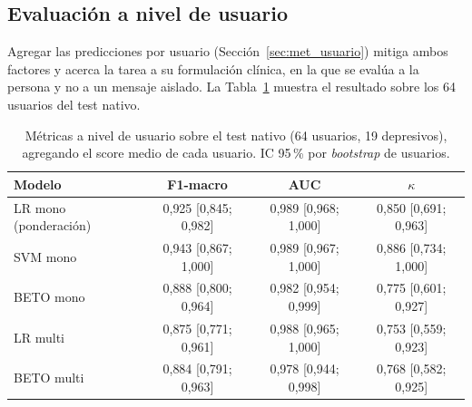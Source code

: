\documentclass[12pt,a4paper]{article}
\begin{document}
\subsection{Evaluación a nivel de usuario}
\label{sec:res_usuario}
Agregar las predicciones por usuario (Sección~\ref{sec:met_usuario}) mitiga ambos factores y acerca la tarea a su formulación clínica, en la que se evalúa a la persona y no a un mensaje aislado. La Tabla~\ref{tab:usuario} muestra el resultado sobre los 64 usuarios del test nativo.

\begin{table}[H]
\centering
\footnotesize
\setlength{\tabcolsep}{4pt}
\caption{Métricas a nivel de usuario sobre el test nativo (64 usuarios, 19 depresivos), agregando el score medio de cada usuario. IC 95\,\% por \emph{bootstrap} de usuarios.}
\label{tab:usuario}
\begin{tabular}{lccc}
\toprule
\textbf{Modelo} & \textbf{F1-macro} & \textbf{AUC} & \textbf{$\kappa$} \\
\midrule
LR mono (ponderación) & 0{,}925 {\scriptsize [0{,}845; 0{,}982]} & 0{,}989 {\scriptsize [0{,}968; 1{,}000]} & 0{,}850 {\scriptsize [0{,}691; 0{,}963]} \\
SVM mono              & 0{,}943 {\scriptsize [0{,}867; 1{,}000]} & 0{,}989 {\scriptsize [0{,}967; 1{,}000]} & 0{,}886 {\scriptsize [0{,}734; 1{,}000]} \\
BETO mono             & 0{,}888 {\scriptsize [0{,}800; 0{,}964]} & 0{,}982 {\scriptsize [0{,}954; 0{,}999]} & 0{,}775 {\scriptsize [0{,}601; 0{,}927]} \\
LR multi              & 0{,}875 {\scriptsize [0{,}771; 0{,}961]} & 0{,}988 {\scriptsize [0{,}965; 1{,}000]} & 0{,}753 {\scriptsize [0{,}559; 0{,}923]} \\
BETO multi            & 0{,}884 {\scriptsize [0{,}791; 0{,}963]} & 0{,}978 {\scriptsize [0{,}944; 0{,}998]} & 0{,}768 {\scriptsize [0{,}582; 0{,}925]} \\
\bottomrule
\end{tabular}
\end{table}
\end{document}

